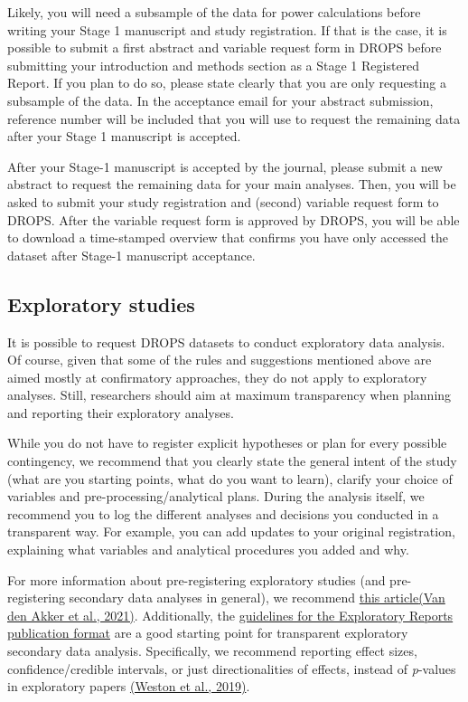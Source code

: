 \documentclass[
]{article}
\begin{document}
Likely, you will need a subsample of the data for power calculations
before writing your Stage 1 manuscript and study registration. If that
is the case, it is possible to submit a first abstract and variable
request form in DROPS before submitting your introduction and methods
section as a Stage 1 Registered Report. If you plan to do so, please
state clearly that you are only requesting a subsample of the data. In
the acceptance email for your abstract submission, reference number will
be included that you will use to request the remaining data after your
Stage 1 manuscript is accepted.

After your Stage-1 manuscript is accepted by the journal, please submit
a new abstract to request the remaining data for your main analyses.
Then, you will be asked to submit your study registration and (second)
variable request form to DROPS. After the variable request form is
approved by DROPS, you will be able to download a time-stamped overview
that confirms you have only accessed the dataset after Stage-1
manuscript acceptance.

\hypertarget{exploratory-studies}{%
\subsection{Exploratory studies}\label{exploratory-studies}}

It is possible to request DROPS datasets to conduct exploratory data
analysis. Of course, given that some of the rules and suggestions
mentioned above are aimed mostly at confirmatory approaches, they do not
apply to exploratory analyses. Still, researchers should aim at maximum
transparency when planning and reporting their exploratory analyses.

While you do not have to register explicit hypotheses or plan for every
possible contingency, we recommend that you clearly state the general
intent of the study (what are you starting points, what do you want to
learn), clarify your choice of variables and pre-processing/analytical
plans. During the analysis itself, we recommend you to log the different
analyses and decisions you conducted in a transparent way. For example,
you can add updates to your original registration, explaining what
variables and analytical procedures you added and why.

For more information about pre-registering exploratory studies (and
pre-registering secondary data analyses in general), we recommend
\href{https://open.lnu.se/index.php/metapsychology/article/view/2625}{this
article}\href{https://www.zotero.org/google-docs/?osv6BM}{(Van den Akker
et al., 2021)}. Additionally, the
\href{https://www.elsevier.com/__data/promis_misc/Exploratory_Reports_Guidelines.pdf}{guidelines
for the Exploratory Reports publication format} are a good starting
point for transparent exploratory secondary data analysis. Specifically,
we recommend reporting effect sizes, confidence/credible intervals, or
just directionalities of effects, instead of \emph{p}-values in
exploratory papers
\href{https://www.zotero.org/google-docs/?NsZXQE}{(Weston et al.,
2019)}.
\end{document}
